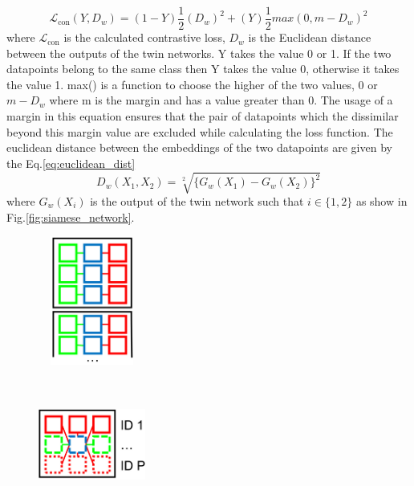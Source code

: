 \begin{equation}
  \label{eq:contrastive_loss}
  \mathcal{L}_{\textrm{con}}(Y,D_{w})= (1-Y)\frac{1}{2}(D_{w})^2 + (Y)\frac{1}{2}{max(0,m-D_{w})}^2
\end{equation}
where $\mathcal{L}_{\textrm{con}}$ is the calculated contrastive loss, $D_{w}$ is the Euclidean distance between the outputs of the twin networks\cite*{siamese_network}. Y takes the value 0 or 1. If the two datapoints belong to the same class then Y takes the value 0, otherwise it takes the value 1\cite*{siamese_network}. max() is a function to choose the higher of the two values, 0 or $m-D_{w}$ where m is the margin and has a value greater than 0\cite*{siamese_network}. The usage of a margin in this equation ensures that the pair of datapoints which the dissimilar beyond this margin value are excluded while calculating the loss function\cite*{siamese_network}. The euclidean distance between the embeddings of the two datapoints are given by the Eq.\ref*{eq:euclidean_dist}\cite*{siamese_network}
\begin{equation}
  \label{eq:euclidean_dist}
  D_{w}(X_{1},X_{2})= \sqrt[2]{\{G_{w}(X_{1}) - G_{w}(X_{2})\}^2}
\end{equation}
where $G_{w}(X_{i})$ is the output of the twin network such that $i \in \{1,2\}$ as show in Fig.\ref*{fig:siamese_network}.
\begin{figure}
  \centering
  \begin{minipage}[t]{.45\textwidth}
    \centering
    \includegraphics[width=100pt,height=120pt]{pictures/offline_triplet.jpg}
    \label{fig:offline_triplet}
  \end{minipage}%
  \hspace{1cm}
  \begin{minipage}[t]{.45\textwidth}
    \centering
    \includegraphics[width=100pt,height=120pt]{pictures/online_triplet.jpg}
    \label{fig:online_triplet}
  \end{minipage}
\end{figure}
